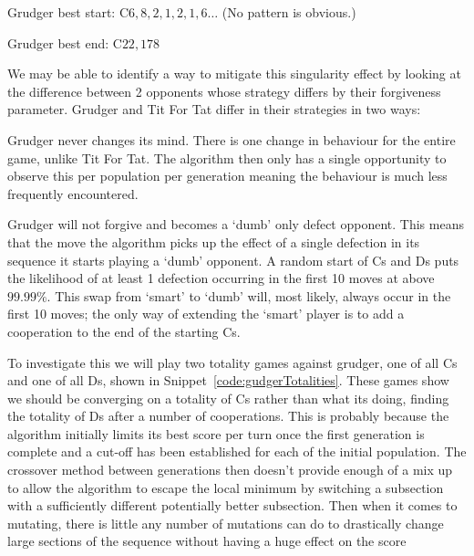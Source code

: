 Grudger best start: C$6,8,2,1,2,1,6\ldots$ (No pattern is obvious.)

Grudger best end: C$22,178$

We may be able to identify a way to mitigate this singularity effect by looking at the difference between 2 opponents whose strategy differs by their forgiveness parameter.
Grudger and Tit For Tat differ in their strategies in two ways:
\begin{itemize}
    \begin{item}
        Grudger never changes its mind.
        There is one change in behaviour for the entire game, unlike Tit For Tat.
        The algorithm then only has a single opportunity to observe this per population per generation meaning the behaviour is much less frequently encountered.
    \end{item}
    \begin{item}
        Grudger will not forgive and becomes a `dumb' only defect opponent.
        This means that the move the algorithm picks up the effect of a single defection in its sequence it starts playing a `dumb' opponent.
        A random start of Cs and Ds puts the likelihood of at least 1 defection occurring in the first 10 moves at above \(99.99\% \).
        This swap from `smart' to `dumb' will, most likely, always occur in the first 10 moves;
        the only way of extending the `smart' player is to add a cooperation to the end of the starting Cs.
    \end{item}
\end{itemize}

To investigate this we will play two totality games against grudger, one of all Cs and one of all Ds, shown in Snippet~\ref{code:gudgerTotalities}. 
These games show we should be converging on a totality of Cs rather than what its doing, finding the totality of Ds after a number of cooperations.
This is probably because the algorithm initially limits its best score per turn once the first generation is complete and a cut-off has been established for each of the initial population.
The crossover method between generations then doesn't provide enough of a mix up to allow the algorithm to escape the local minimum by switching a subsection with a sufficiently different potentially better subsection.
Then when it comes to mutating, there is little any number of mutations can do to drastically change large sections of the sequence without having a huge effect on the score


